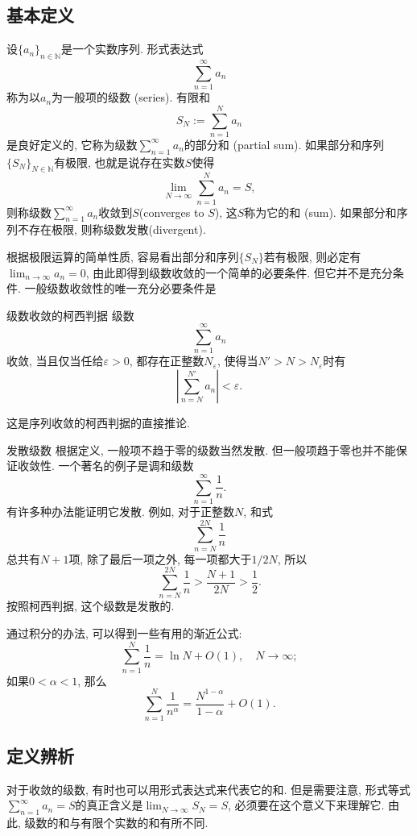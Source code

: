 

\subsection{基本定义}
设$\{a_n\}_{n\in\mathbb{N}}$是一个实数序列. 形式表达式
\[
\sum_{n=1}^\infty a_n
\]
称为以$a_n$为一般项的级数 (series). 有限和
\[
S_N:=\sum_{n=1}^N a_n
\]
是良好定义的, 它称为级数$\sum_{n=1}^\infty a_n$的部分和 (partial sum). 如果部分和序列$\{S_N\}_{N\in\mathbb{N}}$有极限, 也就是说存在实数$S$使得
\[
\lim_{N\to\infty}\sum_{n=1}^N a_n=S,
\] 
则称级数$\sum_{n=1}^\infty a_n$收敛到$S$(converges to $S$), 这$S$称为它的和 (sum). 如果部分和序列不存在极限, 则称级数发散(divergent). 

根据极限运算的简单性质, 容易看出部分和序列$\{S_N\}$若有极限, 则必定有$\lim_{n\to\infty}a_n=0$, 由此即得到级数收敛的一个简单的必要条件. 但它并不是充分条件. 一般级数收敛性的唯一充分必要条件是
\begin{theorem}{级数收敛的柯西判据}
级数
\[
\sum_{n=1}^\infty a_n
\]
收敛, 当且仅当任给$\varepsilon>0$, 都存在正整数$N_\varepsilon$, 使得当$N'>N>N_\varepsilon$时有
$$
\left|\sum_{n=N}^{N'} a_n\right|<\varepsilon.
$$
\end{theorem}
这是序列收敛的柯西判据的直接推论.

\begin{example}{发散级数}
根据定义, 一般项不趋于零的级数当然发散. 但一般项趋于零也并不能保证收敛性. 一个著名的例子是调和级数
$$
\sum_{n=1}^\infty\frac{1}{n}.
$$
有许多种办法能证明它发散. 例如, 对于正整数$N$, 和式
$$
\sum_{n=N}^{2N}\frac{1}{n}
$$
总共有$N+1$项, 除了最后一项之外, 每一项都大于$1/2N$, 所以
$$
\sum_{n=N}^{2N}\frac{1}{n}>\frac{N+1}{2N}>\frac{1}{2}.
$$
按照柯西判据, 这个级数是发散的.

通过积分的办法, 可以得到一些有用的渐近公式:
$$
\sum_{n=1}^{N}\frac{1}{n}=\ln N+O(1),\quad N\to\infty;
$$
如果$0<\alpha<1$, 那么
$$
\sum_{n=1}^{N}\frac{1}{n^\alpha}=\frac{N^{1-\alpha}}{1-\alpha}+O(1).
$$
\end{example}



\subsection{定义辨析}
对于收敛的级数, 有时也可以用形式表达式来代表它的和. 但是需要注意, 形式等式$\sum_{n=1}^\infty a_n=S$的真正含义是$\lim_{N\to\infty}S_N=S$, 必须要在这个意义下来理解它. 由此, 级数的和与有限个实数的和有所不同.